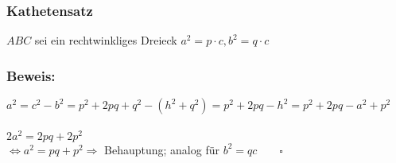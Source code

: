 \subsubsection{Kathetensatz}
$ABC$ sei ein rechtwinkliges Dreieck
$a^{2} = p\cdot c, b^{2} = q\cdot c$
%
%
%
\subsubsection{Beweis:}
$a^{2} = c^{2}-b^{2}=p^{2}+2pq+q^{2}-(h^{2}+q^{2})=p^{2}+2pq-h^{2}=p^{2}+2pq-a^{2}+p^{2}$\\
\qquad\\
$2a^{2}=2pq+2p^{2}$\\
$\Leftrightarrow a^{2} = pq+p^{2} \Rightarrow$ Behauptung; analog für $b^{2} = qc \qquad\square$